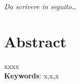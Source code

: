 \documentclass[12pt,a4paper]{article}
\begin{document}
\begin{titlepage}                      
%
\thispagestyle{empty}                   %
\topmargin=6.5cm                        %
\raggedleft                             %
\large                                  %
                                       
\em                                     %
Da scrivere in seguito\ldots                      %
\newpage                                
\clearpage{\pagestyle{empty}\cleardoublepage}%
\end{titlepage}
\linespread{1.2} 
\newpage
\tableofcontents
\linespread{1.5} 
\newpage
\section{Abstract}
 xxxx\\
 
 
\vspace{1cm}
\textbf{Keywords}: x,x,x

\newpage
\end{document}
